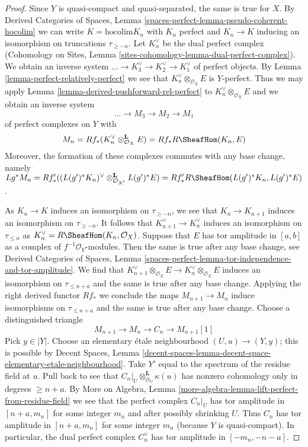 \begin{proof}
Since $Y$ is quasi-compact and quasi-separated, the same is true for $X$.
By Derived Categories of Spaces, Lemma
\ref{spaces-perfect-lemma-pseudo-coherent-hocolim} we can write
$K = \text{hocolim} K_n$ with $K_n$ perfect and $K_n \to K$ inducing
an isomorphism on truncations $\tau_{\geq -n}$. Let $K_n^\vee$
be the dual perfect complex
(Cohomology on Sites, Lemma \ref{sites-cohomology-lemma-dual-perfect-complex}).
We obtain an inverse system $\ldots \to K_3^\vee \to K_2^\vee \to K_1^\vee$
of perfect objects. By Lemma \ref{lemma-perfect-relatively-perfect}
we see that $K_n^\vee \otimes_{\mathcal{O}_X} E$ is $Y$-perfect.
Thus we may apply Lemma \ref{lemma-derived-pushforward-rel-perfect}
to $K_n^\vee \otimes_{\mathcal{O}_X} E$ and we obtain an inverse system
$$
\ldots \to M_3 \to M_2 \to M_1
$$
of perfect complexes on $Y$ with
$$
M_n = Rf_*(K_n^\vee \otimes_{\mathcal{O}_X}^\mathbf{L} E) =
Rf_*R\SheafHom(K_n, E)
$$
Moreover, the formation of these complexes commutes with any
base change, namely $Lg^*M_n =
Rf'_*((L(g')^*K_n)^\vee \otimes_{\mathcal{O}_{X'}}^\mathbf{L} L(g')^*E) =
Rf'_*R\SheafHom(L(g')^*K_n, L(g')^*E)$.

\medskip\noindent
As $K_n \to K$ induces an isomorphism on $\tau_{\geq -n}$, we see that
$K_n \to K_{n + 1}$ induces an isomorphism on $\tau_{\geq -n}$.
It follows that $K_{n + 1}^\vee \to K_n^\vee$
induces an isomorphism on $\tau_{\leq n}$ as
$K_n^\vee = R\SheafHom(K_n, \mathcal{O}_X)$.
Suppose that $E$ has tor amplitude in $[a, b]$ as a complex
of $f^{-1}\mathcal{O}_Y$-modules. Then the same is true after
any base change, see
Derived Categories of Spaces, Lemma
\ref{spaces-perfect-lemma-tor-independence-and-tor-amplitude}.
We find that
$K_{n + 1}^\vee \otimes_{\mathcal{O}_X} E \to
K_n^\vee \otimes_{\mathcal{O}_X} E$
induces an isomorphism on $\tau_{\leq n + a}$
and the same is true after any base change.
Applying the right derived functor $Rf_*$
we conclude the maps $M_{n + 1} \to M_n$
induce isomorphisms on $\tau_{\leq n + a}$
and the same is true after any base change.
Choose a distinguished triangle
$$
M_{n + 1} \to M_n \to C_n \to M_{n + 1}[1]
$$
Pick $y \in |Y|$. Choose an elementary \'etale neighbourhood
$(U, u) \to (Y, y)$; this is possible by
Decent Spaces, Lemma
\ref{decent-spaces-lemma-decent-space-elementary-etale-neighbourhood}.
Take $Y'$ equal to the spectrum of the residue field at $u$.
Pull back to see that $C_n|_U \otimes_{\mathcal{O}_U}^\mathbf{L} \kappa(u)$
has nonzero cohomology only in degrees $\geq n + a$. By
More on Algebra, Lemma
\ref{more-algebra-lemma-lift-perfect-from-residue-field}
we see that the perfect complex $C_n|_U$ has tor amplitude in
$[n + a, m_n]$ for some integer $m_n$ and after possibly shrinking $U$.
Thus $C_n$ has tor amplitude in $[n + a, m_n]$ for some integer $m_n$
(because $Y$ is quasi-compact).
In particular, the dual perfect complex $C_n^\vee$ has tor amplitude in
$[-m_n, -n - a]$.


\end{proof}
